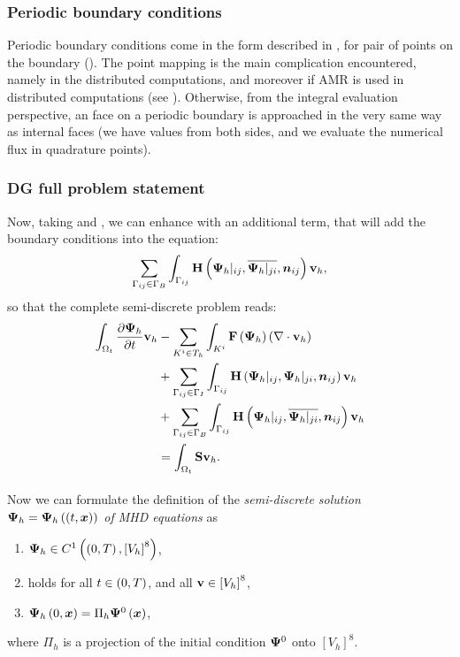\subsubsection{Periodic boundary conditions}
\label{sec:periodicDg}
Periodic boundary conditions come in the form described in , for pair of points on the boundary (). The point mapping is the main complication encountered, namely in the distributed computations, and moreover if AMR is used in distributed computations (see ). Otherwise, from the integral evaluation perspective, an face on a periodic boundary is approached in the very same way as internal faces (we have values from both sides, and we evaluate the numerical flux in quadrature points).

\subsubsection{DG full problem statement}
Now, taking  and , we can enhance  with an additional term, that will add the boundary conditions into the equation:
$$
\sum_{\Gamma_{ij}\in\Gamma_B} \int_{\Gamma_{ij}} \mathrm{\mathbf{H}}\left({\mathrm{\mathbf{\Psi}}_h}|_{ij}, \overline{{\mathrm{\mathbf{\Psi}}_h}|_{ji}}, \mbox{\boldmath $n$}_{ij}\right) \mathrm{\mathbf{v}}_h,
$$
so that the complete semi-discrete problem reads:
\begin{align}
\label{DG3} \int_{\Omega_{t}} \frac{\partial{{\mathrm{\mathbf{\Psi}}_h}}}{\partial{t}} \mathrm{\mathbf{v}}_h & -  \sum_{K^i \in T_h}\int_{K^i}\mathrm{\mathbf{F}}\left({\mathrm{\mathbf{\Psi}}_h}\right) \left(\nabla \cdot \mathrm{\mathbf{v}}_h\right)\\ \nonumber & + \sum_{\Gamma_{ij}\in\Gamma_I} \int_{\Gamma_{ij}} \mathrm{\mathbf{H}}\left({\mathrm{\mathbf{\Psi}}_h}|_{ij}, {\mathrm{\mathbf{\Psi}}_h}|_{ji}, \mbox{\boldmath $n$}_{ij}\right) \mathrm{\mathbf{v}}_h\\
\nonumber & + \sum_{\Gamma_{ij}\in\Gamma_B} \int_{\Gamma_{ij}} \mathrm{\mathbf{H}}\left({\mathrm{\mathbf{\Psi}}_h}|_{ij}, \overline{{\mathrm{\mathbf{\Psi}}_h}|_{ji}}, \mbox{\boldmath $n$}_{ij}\right) \mathrm{\mathbf{v}}_h\\
\nonumber & = \int_{\Omega_{t}} \mathrm{\mathbf{S}} \mathrm{\mathbf{v}}_h.
\end{align}

\paragraph{}
Now we can formulate the definition of the \textit{semi-discrete solution ${\mathrm{\mathbf{\Psi}}_h} = {\mathrm{\mathbf{\Psi}}_h}\left((t, \mbox{\boldmath $x$}\right))$ of MHD equations } as
\begin{enumerate}
    \label{discreteSlnDef}
    \item ${\mathrm{\mathbf{\Psi}}_h} \in C^{1}\left(\left(0, T\right), \left[V_h\right]^8\right)$,
    \item {} holds for all $t\in\left(0, T\right)$, and all $\mathrm{\mathbf{v}}\in \left[V_h\right]^8$,
    \item ${\mathrm{\mathbf{\Psi}}_h}\left(0, \mbox{\boldmath $x$}\right) = \Pi_h \mathrm{\mathbf{\Psi}}^0\left(\mbox{\boldmath $x$}\right)$,
\end{enumerate}
where $\Pi_h$ is a projection of the initial condition $\mathrm{\mathbf{\Psi}}^0$ onto $\left[V_h\right]^8$.


